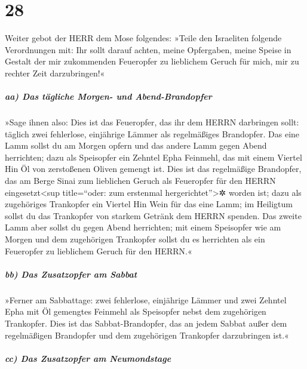 \hypertarget{section-27}{%
\section{28}\label{section-27}}

Weiter gebot der HERR dem Mose folgendes:
»Teile den Israeliten folgende Verordnungen mit: Ihr sollt
darauf achten, meine Opfergaben, meine Speise in Gestalt der mir
zukommenden Feueropfer zu lieblichem Geruch für mich, mir zu rechter
Zeit darzubringen!«

\hypertarget{aa-das-tuxe4gliche-morgen--und-abend-brandopfer}{%
\subparagraph{aa) Das tägliche Morgen- und
Abend-Brandopfer}\label{aa-das-tuxe4gliche-morgen--und-abend-brandopfer}}

»Sage ihnen also: Dies ist das Feueropfer, das ihr dem
HERRN darbringen sollt: täglich zwei fehlerlose, einjährige Lämmer als
regelmäßiges Brandopfer. Das eine Lamm sollst du am Morgen
opfern und das andere Lamm gegen Abend herrichten; dazu
als Speisopfer ein Zehntel Epha Feinmehl, das mit einem Viertel Hin Öl
von zerstoßenen Oliven gemengt ist. Dies ist das
regelmäßige Brandopfer, das am Berge Sinai zum lieblichen Geruch als
Feueropfer für den HERRN eingesetzt\textless sup title=``oder: zum
erstenmal hergerichtet''\textgreater✲ worden ist; dazu als
zugehöriges Trankopfer ein Viertel Hin Wein für das eine Lamm; im
Heiligtum sollst du das Trankopfer von starkem Getränk dem HERRN
spenden. Das zweite Lamm aber sollst du gegen Abend
herrichten; mit einem Speisopfer wie am Morgen und dem zugehörigen
Trankopfer sollst du es herrichten als ein Feueropfer zu lieblichem
Geruch für den HERRN.«

\hypertarget{bb-das-zusatzopfer-am-sabbat}{%
\subparagraph{bb) Das Zusatzopfer am
Sabbat}\label{bb-das-zusatzopfer-am-sabbat}}

»Ferner am Sabbattage: zwei fehlerlose, einjährige Lämmer
und zwei Zehntel Epha mit Öl gemengtes Feinmehl als Speisopfer nebst dem
zugehörigen Trankopfer. Dies ist das Sabbat-Brandopfer,
das an jedem Sabbat außer dem regelmäßigen Brandopfer und dem
zugehörigen Trankopfer darzubringen ist.«

\hypertarget{cc-das-zusatzopfer-am-neumondstage}{%
\subparagraph{cc) Das Zusatzopfer am
Neumondstage}\label{cc-das-zusatzopfer-am-neumondstage}}


